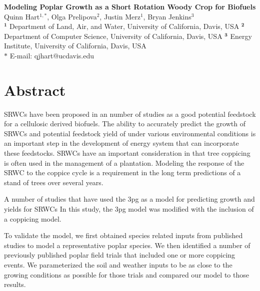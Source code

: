 \documentclass[10pt]{article}
\date{}
\begin{document}
\begin{flushleft}
{\Large
\textbf{Modeling Poplar Growth as a Short Rotation Woody Crop for Biofuels}
}
\\
Quinn Hart$^{1,\ast}$,
Olga Prelipova$^{2}$,
Justin Merz$^{1}$,
Bryan Jenkins$^{3}$
\\
$^{\textbf{1}}$ Department of Land, Air, and Water, University of California, Davis, USA
$^{\textbf{2}}$ Department of Computer Science, University of California, Davis, USA
$^{\textbf{3}}$ Energy Institute, University of California, Davis, USA
\\
$\ast$ E-mail: qjhart@ucdavis.edu
\end{flushleft}

\section*{Abstract}

\acp{SRWC} have been proposed in an number of studies as a good
potential feedstock for a cellulosic derived biofuels.  The ability to
accurately predict the growth of \acp{SRWC} and potential feedstock
yield of under various environmental conditions is an important step
in the development of energy system that can incorporate these
feedstocks.  \acp{SRWC} have an important consideration in that
tree coppicing is often used in the management of a plantation.  Modeling
the response of the \ac{SRWC} to the coppice cycle is a requirement in
the long term predictions of a stand of trees over several years.

A number of studies that have used the \ac{3pg} as a model for
predicting growth and yields for \acp{SRWC} In this study, the
\ac{3pg} model was modified with the inclusion of a
coppicing model.

To validate the model, we first obtained species related inputs from
published studies to model a representative poplar species.  We then
identified a number of previously published poplar field trials that
included one or more coppicing events.  We parameterized the soil and
weather inputs to be as close to the growing conditions as possible
for those trials and compared our model to those results.
 
\end{document}
